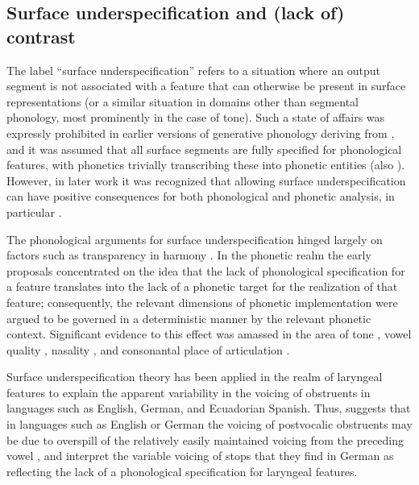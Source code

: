 \subsection{Surface underspecification and (lack of) contrast}
\label{sec:surf-undersp-lack}

The label \enquote{surface underspecification} refers to a situation where an output segment is not associated with a feature that can otherwise be present in surface representations (or a similar situation in domains other than segmental phonology, most prominently in the case of tone). Such a state of affairs was expressly prohibited in earlier versions of generative phonology deriving from \citet{spe}, and it was assumed that all surface segments are fully specified for phonological features, with phonetics trivially transcribing these into phonetic entities (\cf also \citealt{hale-kissock-reiss,hale-reiss2008}). However, in later work it was recognized that allowing surface underspecification can have positive consequences for both phonological and phonetic analysis, \cf in particular \citet{pierrehumbert80:_englis,keating88:_under,pierrehumbert88:_japan}.

The phonological arguments for surface underspecification hinged largely on factors such as transparency in harmony \citep[\egm][]{steriade87:_redun}. In the phonetic realm the early proposals concentrated on the idea that the lack of phonological specification for a feature translates into the lack of a phonetic target for the realization of that feature; consequently, the relevant dimensions of phonetic implementation were argued to be governed in a deterministic manner by the relevant phonetic context. Significant evidence to this effect was amassed in the area of tone \citep{pierrehumbert80:_englis,pierrehumbert88:_japan,davison92:_param_mandar,myers98:_surfac_under_tone_chich}, vowel quality \citep{bergem94,choi95:_marsh}, nasality \citep{cohn93:_nasal_englis,huffman93:_phonet}, and consonantal place of articulation \citep{keating88}.

Surface underspecification theory has been applied in the realm of laryngeal features to explain the apparent variability in the voicing of obstruents in languages such as English, German, and Ecuadorian Spanish. Thus, \citet[§2.2.2, §2.3.1]{jansen04:_laryn} suggests that in languages such as English or German the voicing of postvocalic obstruents may be due to overspill of the relatively easily maintained voicing from the preceding vowel \citep{westbury86:_natur_stop_conson_voicin}, and \citet{jessen02:_laryn_german} interpret the variable voicing of stops that they find in German as reflecting the lack of a phonological specification for laryngeal features.

